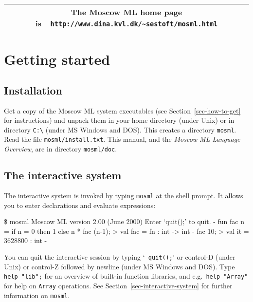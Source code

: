 \documentclass[fleqn]{article}
\begin{document}
\vfill

\begin{center}
\begin{tabular}{|c|}\hline
\rule[-0.4cm]{0cm}{1cm}The Moscow ML home page is\ \
    \verb$http://www.dina.kvl.dk/~sestoft/mosml.html$\\\hline
\end{tabular}
\end{center}

\vfill

\tableofcontents

\newpage

\section{Getting started}
\label{sec-getting-started}

\subsection{Installation}

Get a copy of the Moscow ML system executables (see
Section~\ref{sec-how-to-get} for instructions) and unpack them in your
home directory (under Unix) or in directory \verb#C:\# (under MS
Windows and DOS)\@.  This creates a directory {\tt mosml}.  Read the
file {\tt mosml/install.txt}.  This manual, and the {\em Moscow ML
  Language Overview\/}, are in directory {\tt mosml/doc}.


\subsection{The interactive system}

The interactive system is invoked by typing {\tt mosml} at the shell
prompt.  It allows you to enter declarations and evaluate expressions:

\begin{program}
\$ mosml
Moscow ML version 2.00 (June 2000)
Enter `quit();' to quit.
-  fun fac n = if n = 0 then 1 else n * fac (n-1);
> val fac = fn : int -> int
-  fac 10;
> val it = 3628800 : int
-
\end{program}

\noindent You can quit the interactive session by typing `{\tt
  quit();}' or control-D (under Unix) or control-Z followed by newline
(under MS Windows and DOS)\@.  Type {\tt help "lib";} for an overview
of built-in function libraries, and e.g.\ {\tt help "Array"} for help
on {\tt Array} operations.  See Section~\ref{sec-interactive-system}
for further information on {\tt mosml}.
\end{document}
